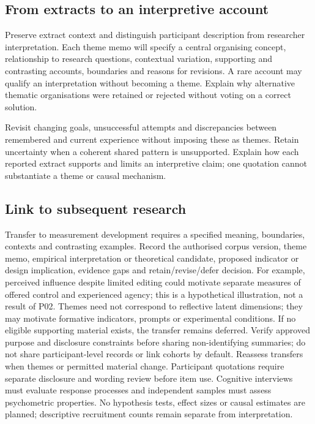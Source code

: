 \subsection{From extracts to an interpretive account}
Preserve extract context and distinguish participant description from researcher interpretation. Each theme memo will specify a central organising concept, relationship to research questions, contextual variation, supporting and contrasting accounts, boundaries and reasons for revisions. A rare account may qualify an interpretation without becoming a theme. Explain why alternative thematic organisations were retained or rejected without voting on a correct solution.

Revisit changing goals, unsuccessful attempts and discrepancies between remembered and current experience without imposing these as themes. Retain uncertainty when a coherent shared pattern is unsupported. Explain how each reported extract supports and limits an interpretive claim; one quotation cannot substantiate a theme or causal mechanism.

\subsection{Link to subsequent research}
Transfer to measurement development requires a specified meaning, boundaries, contexts and contrasting examples. Record the authorised corpus version, theme memo, empirical interpretation or theoretical candidate, proposed indicator or design implication, evidence gaps and retain/revise/defer decision. For example, perceived influence despite limited editing could motivate separate measures of offered control and experienced agency; this is a hypothetical illustration, not a result of P02. Themes need not correspond to reflective latent dimensions; they may motivate formative indicators, prompts or experimental conditions. If no eligible supporting material exists, the transfer remains deferred. Verify approved purpose and disclosure constraints before sharing non-identifying summaries; do not share participant-level records or link cohorts by default. Reassess transfers when themes or permitted material change. Participant quotations require separate disclosure and wording review before item use. Cognitive interviews must evaluate response processes and independent samples must assess psychometric properties. No hypothesis tests, effect sizes or causal estimates are planned; descriptive recruitment counts remain separate from interpretation.

